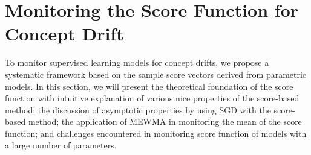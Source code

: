 \documentclass[twoside,11pt]{article}
\begin{document}
%
%
%

\section{Monitoring the Score Function for Concept Drift}
\label{s:theory_analysis_score}

To {monitor supervised learning models for} concept {drifts}, we propose a systematic framework based on the sample score vectors derived from parametric models. In this section, we will present the theoretical foundation of the score function with intuitive explanation of various nice properties of the score-based method; the discussion of asymptotic properties by using SGD with the score-based method; the application of MEWMA in monitoring the mean of the score function; and challenges encountered in monitoring score function of models with a large number of parameters.
\end{document}
